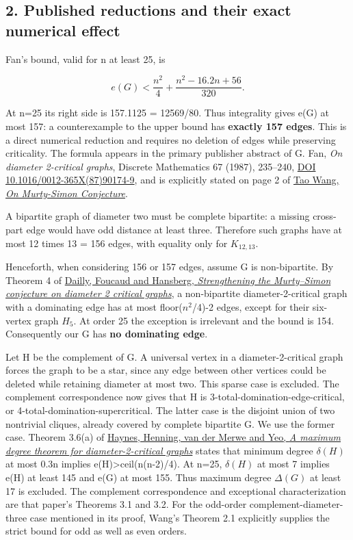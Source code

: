 \documentclass[
  11pt,
]{article}
\begin{document}
\hypertarget{published-reductions-and-their-exact-numerical-effect}{%
\subsection{2. Published reductions and their exact numerical
effect}\label{published-reductions-and-their-exact-numerical-effect}}

Fan's bound, valid for n at least 25, is

\[
e(G)<\frac{n^2}{4}+\frac{n^2-16.2n+56}{320}.
\]

At n=25 its right side is 157.1125 = 12569/80. Thus integrality gives
e(G) at most 157: a counterexample to the upper bound has
\textbf{exactly 157 edges}. This is a direct numerical reduction and
requires no deletion of edges while preserving criticality. The formula
appears in the primary publisher abstract of G. Fan, \emph{On diameter
2-critical graphs}, Discrete Mathematics 67 (1987), 235--240,
\href{https://www.sciencedirect.com/science/article/pii/0012365X87901749}{DOI
10.1016/0012-365X(87)90174-9}, and is explicitly stated on page 2 of
\href{https://arxiv.org/pdf/1205.4397}{Tao Wang, \emph{On Murty-Simon
Conjecture}}.

A bipartite graph of diameter two must be complete bipartite: a missing
cross-part edge would have odd distance at least three. Therefore such
graphs have at most 12 times 13 = 156 edges, with equality only for
\ensuremath{K_{12,13}}.

Henceforth, when considering 156 or 157 edges, assume G is
non-bipartite. By Theorem 4 of
\href{https://arxiv.org/pdf/1812.08420}{Dailly, Foucaud and Hansberg,
\emph{Strengthening the Murty--Simon conjecture on diameter 2 critical
graphs}}, a non-bipartite diameter-2-critical graph with a dominating
edge has at most floor(\ensuremath{n^2}/4)-2 edges, except for their
six-vertex graph \ensuremath{H_5}. At order 25 the exception is
irrelevant and the bound is 154. Consequently our G has \textbf{no
dominating edge}.

Let H be the complement of G. A universal vertex in a
diameter-2-critical graph forces the graph to be a star, since any edge
between other vertices could be deleted while retaining diameter at most
two. This sparse case is excluded. The complement correspondence now
gives that H is 3-total-domination-edge-critical, or
4-total-domination-supercritical. The latter case is the disjoint union
of two nontrivial cliques, already covered by complete bipartite G. We
use the former case. Theorem 3.6(a) of
\href{https://d-nb.info/1372516379/34}{Haynes, Henning, van der Merwe
and Yeo, \emph{A maximum degree theorem for diameter-2-critical graphs}}
states that minimum degree \ensuremath{\delta (H)} at most 0.3n implies
e(H)\textgreater ceil(n(n-2)/4). At n=25, \ensuremath{\delta (H)} at
most 7 implies e(H) at least 145 and e(G) at most 155. Thus maximum
degree \ensuremath{\Delta (G)} at least 17 is excluded. The complement
correspondence and exceptional characterization are that paper's
Theorems 3.1 and 3.2. For the odd-order complement-diameter-three case
mentioned in its proof, Wang's Theorem 2.1 explicitly supplies the
strict bound for odd as well as even orders.
\end{document}
